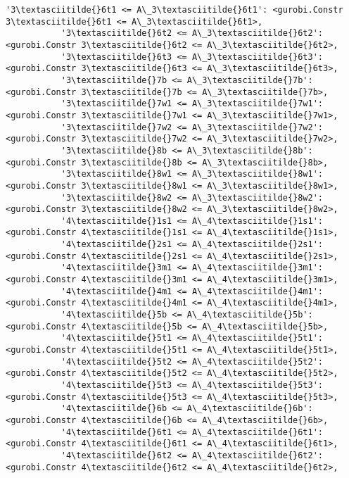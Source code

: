 \documentclass[11pt]{article}
\begin{document}
\begin{Verbatim}[commandchars=\\\{\}]
           '3\textasciitilde{}6t1 <= A\_3\textasciitilde{}6t1': <gurobi.Constr 3\textasciitilde{}6t1 <= A\_3\textasciitilde{}6t1>,
           '3\textasciitilde{}6t2 <= A\_3\textasciitilde{}6t2': <gurobi.Constr 3\textasciitilde{}6t2 <= A\_3\textasciitilde{}6t2>,
           '3\textasciitilde{}6t3 <= A\_3\textasciitilde{}6t3': <gurobi.Constr 3\textasciitilde{}6t3 <= A\_3\textasciitilde{}6t3>,
           '3\textasciitilde{}7b <= A\_3\textasciitilde{}7b': <gurobi.Constr 3\textasciitilde{}7b <= A\_3\textasciitilde{}7b>,
           '3\textasciitilde{}7w1 <= A\_3\textasciitilde{}7w1': <gurobi.Constr 3\textasciitilde{}7w1 <= A\_3\textasciitilde{}7w1>,
           '3\textasciitilde{}7w2 <= A\_3\textasciitilde{}7w2': <gurobi.Constr 3\textasciitilde{}7w2 <= A\_3\textasciitilde{}7w2>,
           '3\textasciitilde{}8b <= A\_3\textasciitilde{}8b': <gurobi.Constr 3\textasciitilde{}8b <= A\_3\textasciitilde{}8b>,
           '3\textasciitilde{}8w1 <= A\_3\textasciitilde{}8w1': <gurobi.Constr 3\textasciitilde{}8w1 <= A\_3\textasciitilde{}8w1>,
           '3\textasciitilde{}8w2 <= A\_3\textasciitilde{}8w2': <gurobi.Constr 3\textasciitilde{}8w2 <= A\_3\textasciitilde{}8w2>,
           '4\textasciitilde{}1s1 <= A\_4\textasciitilde{}1s1': <gurobi.Constr 4\textasciitilde{}1s1 <= A\_4\textasciitilde{}1s1>,
           '4\textasciitilde{}2s1 <= A\_4\textasciitilde{}2s1': <gurobi.Constr 4\textasciitilde{}2s1 <= A\_4\textasciitilde{}2s1>,
           '4\textasciitilde{}3m1 <= A\_4\textasciitilde{}3m1': <gurobi.Constr 4\textasciitilde{}3m1 <= A\_4\textasciitilde{}3m1>,
           '4\textasciitilde{}4m1 <= A\_4\textasciitilde{}4m1': <gurobi.Constr 4\textasciitilde{}4m1 <= A\_4\textasciitilde{}4m1>,
           '4\textasciitilde{}5b <= A\_4\textasciitilde{}5b': <gurobi.Constr 4\textasciitilde{}5b <= A\_4\textasciitilde{}5b>,
           '4\textasciitilde{}5t1 <= A\_4\textasciitilde{}5t1': <gurobi.Constr 4\textasciitilde{}5t1 <= A\_4\textasciitilde{}5t1>,
           '4\textasciitilde{}5t2 <= A\_4\textasciitilde{}5t2': <gurobi.Constr 4\textasciitilde{}5t2 <= A\_4\textasciitilde{}5t2>,
           '4\textasciitilde{}5t3 <= A\_4\textasciitilde{}5t3': <gurobi.Constr 4\textasciitilde{}5t3 <= A\_4\textasciitilde{}5t3>,
           '4\textasciitilde{}6b <= A\_4\textasciitilde{}6b': <gurobi.Constr 4\textasciitilde{}6b <= A\_4\textasciitilde{}6b>,
           '4\textasciitilde{}6t1 <= A\_4\textasciitilde{}6t1': <gurobi.Constr 4\textasciitilde{}6t1 <= A\_4\textasciitilde{}6t1>,
           '4\textasciitilde{}6t2 <= A\_4\textasciitilde{}6t2': <gurobi.Constr 4\textasciitilde{}6t2 <= A\_4\textasciitilde{}6t2>,

\end{Verbatim}
\end{document}
